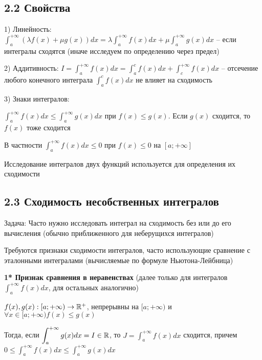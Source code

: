 \documentclass[12pt]{article}
\begin{document}
    \subsection{2.2 Свойства}
    \hypertarget{improperintegralproperties}{}

    1) Линейность: $\displaystyle \int^{+\infty}_{a} (\lambda f(x) + \mu g(x)) dx = \lambda \int^{+\infty}_{a} f(x) dx + \mu \int^{+\infty}_{a} g(x) dx$
        -- если интегралы сходятся (иначе исследуем по определению через предел)

    2) Аддитивность: $\displaystyle I = \int^{+\infty}_{a} f(x) dx = \int^{c}_{a} f(x) dx + \int^{+\infty}_{c} f(x) dx$
        -- отсечение любого конечного интеграла $\int^{c}_{a} f(x) dx$ не влияет на сходимость

    3) Знаки интегралов:

    $\displaystyle \int^{+\infty}_{a} f(x) dx \leq \int^{+\infty}_{a} g(x) dx $ при $f(x) \leq g(x)$. Если $g(x)$ сходится, то $f(x)$ тоже сходится

    В частности $\displaystyle \int^{+\infty}_{a} f(x) dx \leq 0$ при $f(x) \leq 0$ на $[a; +\infty]$

    \Nota Исследование интегралов двух функций используется для определения их сходимости


    \subsection{2.3 Сходимость несобственных интегралов}
    \hypertarget{improperintegralconvergence}{}

    Задача: Часто нужно исследовать интеграл на сходимость без или до его вычисления (обычно приближенного для неберущихся интегралов)

    Требуются признаки сходимости интегралов, часто использующие сравнение с эталонными интегралами (вычисляемые по формуле Ньютона-Лейбница)

    \hypertarget{improperintegralconvergenceininequalities}{}
    \textbf{1* Признак сравнения в неравенствах} (далее только для интегралов $\displaystyle \int^{+\infty}_{a} f(x) dx$, для остальных аналогично)

    $f(x), g(x) : [a;+\infty) \to \mathbb{R}^+$, непрерывны на $[a;+\infty)$ и $\forall x \in [a;+\infty) f(x) \leq g(x)$


    Тогда, если $\displaystyle \int^{+\infty}_{a} g(x) dx = I \in \mathbb{R}$, то $\displaystyle J = \int^{+\infty}_{a} f(x) dx$ сходится,
    причем $\displaystyle0 \leq \int^{+\infty}_{a} f(x) dx \leq \int^{+\infty}_{a} g(x) dx$
\end{document}
